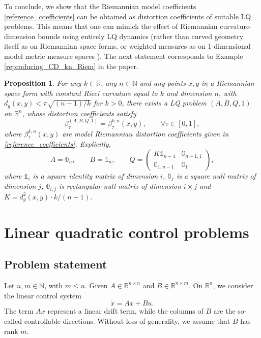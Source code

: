 \documentclass[reqno]{amsart}
\theoremstyle{plain}
\newtheorem{prop}[thm]{Proposition}
\theoremstyle{definition}
\theoremstyle{remark}
\newcommand{\N}{\mathbb N}
\begin{document}
To conclude, we show that the Riemannian model coefficients \eqref{reference_coefficients} can be obtained as distortion coefficients of suitable LQ problems. This means that one can mimick the effect of Riemannian curvature-dimension bounds using entirely LQ dynamics (rather than curved geometry itself as on Riemannian space forms, or weighted measures as on 1-dimensional model metric measure spaces \cite[Example 14.10]{Villanioldandnew}). The next statement corresponds to Example \ref{reproducing_CD_kn_Riem} in the paper.
 \begin{prop}
	 	For any $k\in\mathbb{R}$, any $n\in\mathbb{N}$ and any points $x,y$ in a Riemannian space form with constant Ricci curvature equal to $k$ and dimension $n$, with $d_g(x,y)<\pi\sqrt{(n-1)/k}$ for $k>0$, there exists a LQ problem $(A,B,Q,1)$ on $\mathbb{R}^n$, whose distortion coefficients satisfy
	 	\begin{equation}
	 		\beta_\tau^{(A,B,Q,1)}=\beta_\tau^{k,n}(x,y),\qquad\forall \tau\in[0,1],
	 	\end{equation}
	 	where $\beta_\tau^{k,n}(x,y)$ are model Riemannian distortion coefficients given in \eqref{reference_coefficients}. Explicitly,
	 	\begin{equation}
	 		A=\mathbb{0}_n,\qquad B=\mathbb{1}_n,\qquad Q=\begin{pmatrix}
	 			K\mathbb{1}_{n-1} & \mathbb{0}_{n-1,1}\\
	 			\mathbb{0}_{1,n-1} & \mathbb{0}_1
	 		\end{pmatrix},
	 	\end{equation}
	 	where $\mathbb{1}_i$ is a square identity matrix of dimension $i$, $\mathbb{0}_j$ is a square null matrix of dimension $j$, $\mathbb{0}_{i,j}$ is rectangular null matrix of dimension $i\times j$ and $K=d_g^2(x,y)\cdot k/(n-1)$.
	 \end{prop}




\section{Linear quadratic control problems}\label{LQ_control_problems}
\subsection{Problem statement}

    Let $n,m\in \N$, with $m\leq n$. Given $A\in \mathbb{R}^{n \times n}$ and $B\in\mathbb{R}^{n \times m}$. On $\mathbb{R}^n$, we consider the linear control system
		\begin{equation}\label{lq}
		\dot{x}=Ax+Bu.
		\end{equation}
	  The term $Ax$ represent a linear drift term, while the columns of $B$ are the so-called controllable directions.  Without loss of generality, we assume that $B$ has rank $m$.
      
\end{document}
